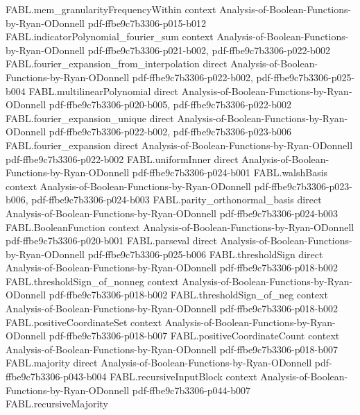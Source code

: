 \begin{theorem}
\proofstep
  {FABL.mem_granularityFrequencyWithin}
  {context}
  {Analysis-of-Boolean-Functions-by-Ryan-ODonnell}
  {pdf-ffbe9c7b3306-p015-b012}
\proofstep
  {FABL.indicatorPolynomial_fourier_sum}
  {context}
  {Analysis-of-Boolean-Functions-by-Ryan-ODonnell}
  {pdf-ffbe9c7b3306-p021-b002,
    pdf-ffbe9c7b3306-p022-b002}
\proofstep
  {FABL.fourier_expansion_from_interpolation}
  {direct}
  {Analysis-of-Boolean-Functions-by-Ryan-ODonnell}
  {pdf-ffbe9c7b3306-p022-b002,
    pdf-ffbe9c7b3306-p025-b004}
\proofstep
  {FABL.multilinearPolynomial}
  {direct}
  {Analysis-of-Boolean-Functions-by-Ryan-ODonnell}
  {pdf-ffbe9c7b3306-p020-b005,
    pdf-ffbe9c7b3306-p022-b002}
\proofstep
  {FABL.fourier_expansion_unique}
  {direct}
  {Analysis-of-Boolean-Functions-by-Ryan-ODonnell}
  {pdf-ffbe9c7b3306-p022-b002,
    pdf-ffbe9c7b3306-p023-b006}
\proofstep
  {FABL.fourier_expansion}
  {direct}
  {Analysis-of-Boolean-Functions-by-Ryan-ODonnell}
  {pdf-ffbe9c7b3306-p022-b002}
\proofstep
  {FABL.uniformInner}
  {direct}
  {Analysis-of-Boolean-Functions-by-Ryan-ODonnell}
  {pdf-ffbe9c7b3306-p024-b001}
\proofstep
  {FABL.walshBasis}
  {context}
  {Analysis-of-Boolean-Functions-by-Ryan-ODonnell}
  {pdf-ffbe9c7b3306-p023-b006,
    pdf-ffbe9c7b3306-p024-b003}
\proofstep
  {FABL.parity_orthonormal_basis}
  {direct}
  {Analysis-of-Boolean-Functions-by-Ryan-ODonnell}
  {pdf-ffbe9c7b3306-p024-b003}
\proofstep
  {FABL.BooleanFunction}
  {context}
  {Analysis-of-Boolean-Functions-by-Ryan-ODonnell}
  {pdf-ffbe9c7b3306-p020-b001}
\proofstep
  {FABL.parseval}
  {direct}
  {Analysis-of-Boolean-Functions-by-Ryan-ODonnell}
  {pdf-ffbe9c7b3306-p025-b006}
\proofstep
  {FABL.thresholdSign}
  {direct}
  {Analysis-of-Boolean-Functions-by-Ryan-ODonnell}
  {pdf-ffbe9c7b3306-p018-b002}
\proofstep
  {FABL.thresholdSign_of_nonneg}
  {context}
  {Analysis-of-Boolean-Functions-by-Ryan-ODonnell}
  {pdf-ffbe9c7b3306-p018-b002}
\proofstep
  {FABL.thresholdSign_of_neg}
  {context}
  {Analysis-of-Boolean-Functions-by-Ryan-ODonnell}
  {pdf-ffbe9c7b3306-p018-b002}
\proofstep
  {FABL.positiveCoordinateSet}
  {context}
  {Analysis-of-Boolean-Functions-by-Ryan-ODonnell}
  {pdf-ffbe9c7b3306-p018-b007}
\proofstep
  {FABL.positiveCoordinateCount}
  {context}
  {Analysis-of-Boolean-Functions-by-Ryan-ODonnell}
  {pdf-ffbe9c7b3306-p018-b007}
\proofstep
  {FABL.majority}
  {direct}
  {Analysis-of-Boolean-Functions-by-Ryan-ODonnell}
  {pdf-ffbe9c7b3306-p043-b004}
\proofstep
  {FABL.recursiveInputBlock}
  {context}
  {Analysis-of-Boolean-Functions-by-Ryan-ODonnell}
  {pdf-ffbe9c7b3306-p044-b007}
\proofstep
  {FABL.recursiveMajority}

\end{theorem}

